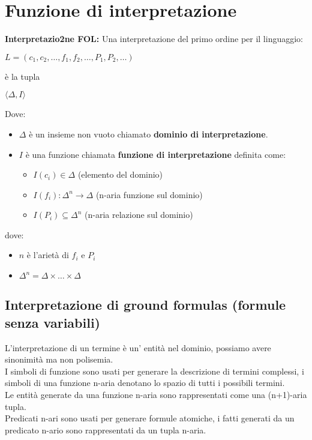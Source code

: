 \documentclass[../main.tex]{subfiles}
\begin{document}
   \section{Funzione di interpretazione}
   \textbf{Interpretazio2ne FOL:} Una interpretazione del primo ordine per il linguaggio:
   \begin{center}
      $L=(c_1,c_2, \dots, f_1,f_2, \dots, P_1,P_2, \dots)$
   \end{center}
   è la tupla
   \begin{center}
      $\langle \Delta, I \rangle$
   \end{center}
   Dove:
   \begin{itemize}
      \item $\Delta$ è un insieme non vuoto chiamato \textbf{dominio di interpretazione}.
      \item $I$ è una funzione chiamata \textbf{funzione di interpretazione} definita come:
      \begin{itemize}
         \item $I(c_i) \in \Delta$ (elemento del dominio)
         \item $I(f_i) : \Delta^n \to \Delta$ (n-aria funzione sul dominio)
         \item $I(P_i) \subseteq \Delta^n$ (n-aria relazione sul dominio)
      \end{itemize}
   \end{itemize}
   dove:
   \begin{itemize}
      \item $n$ è l'arietà di $f_i$ e $P_i$
      \item $\Delta^n = \Delta \times \dots \times \Delta$ 
   \end{itemize}

   \subsection{Interpretazione di ground formulas (formule senza variabili)}
   L'interpretazione di un termine è un' entità nel dominio, possiamo avere sinonimità ma non polisemia.\\
   I simboli di funzione sono usati per generare la descrizione di termini complessi, i simboli di una funzione n-aria denotano lo spazio di tutti i possibili termini.\\
   Le entità generate da una funzione n-aria sono rappresentati come una (n+1)-aria tupla.\\
   Predicati n-ari sono usati per generare formule atomiche, i fatti generati da un predicato n-ario sono rappresentati da un tupla n-aria.
\end{document}
